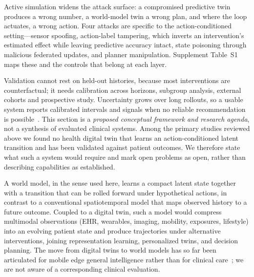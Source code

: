 \documentclass[journal]{IEEEtran}
\begin{document}
Active simulation widens the attack surface: a compromised predictive twin produces a wrong number, a world-model twin a wrong plan, and where the loop actuates, a wrong action. Four attacks are specific to the action-conditioned setting---sensor spoofing, action-label tampering, which inverts an intervention's estimated effect while leaving predictive accuracy intact, state poisoning through malicious federated updates, and planner manipulation. Supplement Table~S1 maps these and the controls that belong at each layer.

Validation cannot rest on held-out histories, because most interventions are counterfactual; it needs calibration across horizons, subgroup analysis, external cohorts and prospective study. Uncertainty grows over long rollouts, so a usable system reports calibrated intervals and signals when no reliable recommendation is possible~\cite{Sel2025VVUQ}.
\else
This section is a \emph{proposed conceptual framework and research agenda}, not a synthesis of evaluated clinical systems. Among the primary studies reviewed above we found no health digital twin that learns an action-conditioned latent transition and has been validated against patient outcomes. We therefore state what such a system would require and mark open problems as open, rather than describing capabilities as established.

A world model, in the sense used here, learns a compact latent state together with a transition that can be rolled forward under hypothetical actions, in contrast to a conventional spatiotemporal model that maps observed history to a future outcome. Coupled to a digital twin, such a model would compress multimodal observations (EHR, wearables, imaging, mobility, exposures, lifestyle) into an evolving patient state and produce trajectories under alternative interventions, joining representation learning, personalized twins, and decision planning. The move from digital twins to world models has so far been articulated for mobile edge general intelligence rather than for clinical care~\cite{Zheng2026DTtoWM}; we are not aware of a corresponding clinical evaluation.
\end{document}

